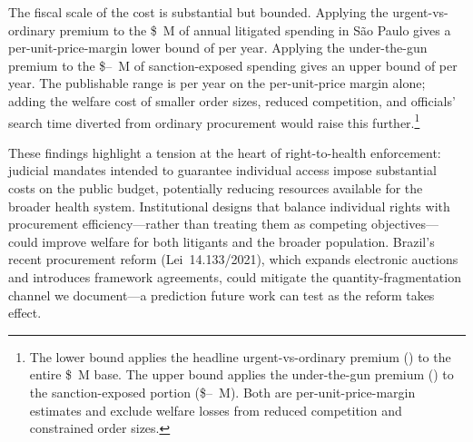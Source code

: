 The fiscal scale of the cost is substantial but bounded. Applying the urgent-vs-ordinary premium to the \$\BPlitSpendingUSDmm~M of annual litigated spending in S\~ao Paulo gives a per-unit-price-margin lower bound of \BPwelfareBoundLow{} per year. Applying the under-the-gun premium to the \$\BPsanctionExposedUSDmmLow--\BPsanctionExposedUSDmmHigh~M of sanction-exposed spending gives an upper bound of \BPwelfareBoundHigh{} per year. The publishable range is \BPwelfareBoundRange{} per year on the per-unit-price margin alone; adding the welfare cost of smaller order sizes, reduced competition, and officials' search time diverted from ordinary procurement would raise this further.\footnote{The lower bound applies the headline urgent-vs-ordinary premium (\BPnegPctHeadline) to the entire \$\BPlitSpendingUSDmm~M base. The upper bound applies the under-the-gun premium (\BPutgPctRange) to the sanction-exposed portion (\$\BPsanctionExposedUSDmmLow--\BPsanctionExposedUSDmmHigh~M). Both are per-unit-price-margin estimates and exclude welfare losses from reduced competition and constrained order sizes.}

These findings highlight a tension at the heart of right-to-health enforcement: judicial mandates intended to guarantee individual access impose substantial costs on the public budget, potentially reducing resources available for the broader health system. Institutional designs that balance individual rights with procurement efficiency---rather than treating them as competing objectives---could improve welfare for both litigants and the broader population. Brazil's recent procurement reform (Lei~14.133/2021), which expands electronic auctions and introduces framework agreements, could mitigate the quantity-fragmentation channel we document---a prediction future work can test as the reform takes effect.
